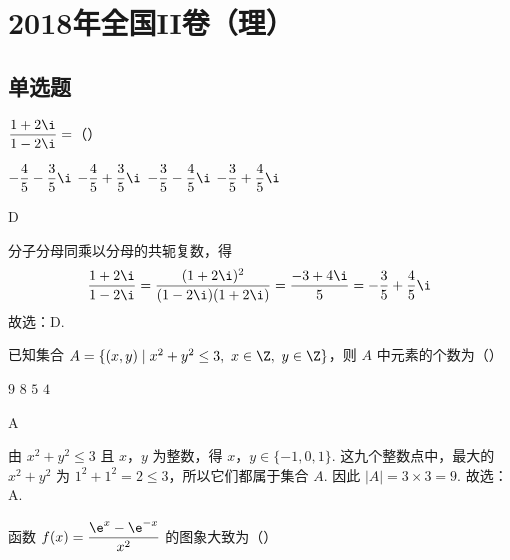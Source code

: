 \chapter{2018年全国II卷（理）}

\section{单选题}

\begin{problem}
\(\dfrac{1+2\i}{1-2\i}=\)（\quad）

\choices
    {\(-\dfrac45-\dfrac35\i\)}
    {\(-\dfrac45+\dfrac35\i\)}
    {\(-\dfrac35-\dfrac45\i\)}
    {\(-\dfrac35+\dfrac45\i\)}
\end{problem}

\begin{answer}
D
\end{answer}

\begin{solution}
分子分母同乘以分母的共轭复数，得
\[
\frac{1+2\i}{1-2\i}=\frac{(1+2\i)^2}{(1-2\i)(1+2\i)}=\frac{-3+4\i}{5}=-\frac35+\frac45\i
\]
故选：D.
\end{solution}

\begin{problem}
已知集合 \(A=\{(x,y)\mid x^2+y^2\le 3,\ x\in\Z,\ y\in\Z\}\)，则 \(A\) 中元素的个数为（\quad）

\choices
    {\(9\)}
    {\(8\)}
    {\(5\)}
    {\(4\)}
\end{problem}

\begin{answer}
A
\end{answer}

\begin{solution}
由 \(x^2+y^2\le3\) 且 \(x\)，\(y\) 为整数，得
\(x\)，\(y\in\{-1,0,1\}\). 这九个整数点中，最大的 \(x^2+y^2\) 为
\(1^2+1^2=2\le3\)，所以它们都属于集合 \(A\). 因此
\(|A|=3\times3=9\).
故选：A.
\end{solution}

\begin{problem}
函数 \(f(x)=\dfrac{\e^x-\e^{-x}}{x^2}\) 的图象大致为（\quad）

    {}
    {}
    {}
\end{problem}

